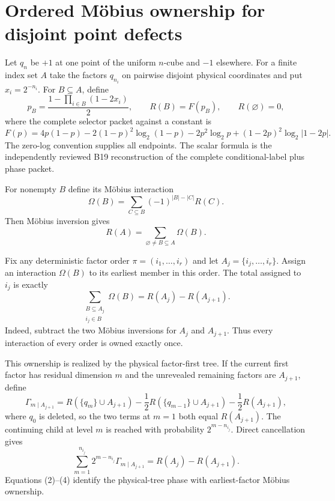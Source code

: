 \section*{Ordered Möbius ownership for disjoint point defects}

Let $q_n$ be $+1$ at one point of the uniform $n$-cube and $-1$
elsewhere.  For a finite index set $A$ take the factors $q_{n_i}$ on
pairwise disjoint physical coordinates and put $x_i=2^{-n_i}$.  For
$B\subseteq A$, define
\[
 p_B=\frac{1-\prod_{i\in B}(1-2x_i)}2,
 \qquad R(B)=F(p_B),\qquad R(\varnothing)=0,
\]
where the complete selector packet against a constant is
\[
 F(p)=4p(1-p)-2(1-p)^2\log_2(1-p)-2p^2\log_2p
 +(1-2p)^2\log_2|1-2p|.
\]
The zero-log convention supplies all endpoints.  The scalar formula is the
independently reviewed B19 reconstruction of the complete conditional-label
plus phase packet.

For nonempty $B$ define its Möbius interaction
\[
 \Omega(B)=\sum_{C\subseteq B}(-1)^{|B|-|C|}R(C).
\]
Then Möbius inversion gives
\begin{equation}
 R(A)=\sum_{\varnothing\ne B\subseteq A}\Omega(B).       \tag{1}
\end{equation}

Fix any deterministic factor order $\pi=(i_1,\ldots,i_r)$ and let
$A_j=\{i_j,\ldots,i_r\}$.  Assign an interaction $\Omega(B)$ to its earliest
member in this order.  The total assigned to $i_j$ is exactly
\begin{equation}
 \sum_{\substack{B\subseteq A_j\\ i_j\in B}}\Omega(B)
 =R(A_j)-R(A_{j+1}).                                    \tag{2}
\end{equation}
Indeed, subtract the two Möbius inversions for $A_j$ and $A_{j+1}$.
Thus every interaction of every order is owned exactly once.

This ownership is realized by the physical factor-first tree.  If the
current first factor has residual dimension $m$ and the unrevealed remaining
factors are $A_{j+1}$, define
\[
 \Gamma_{m\mid A_{j+1}}
 =R(\{q_m\}\cup A_{j+1})
 -\frac12R(\{q_{m-1}\}\cup A_{j+1})
 -\frac12R(A_{j+1}),                                    \tag{3}
\]
where $q_0$ is deleted, so the two terms at $m=1$ both equal
$R(A_{j+1})$.  The continuing child at level $m$ is reached with probability
$2^{m-n_{i_j}}$.  Direct cancellation gives
\begin{equation}
 \sum_{m=1}^{n_{i_j}}2^{m-n_{i_j}}\Gamma_{m\mid A_{j+1}}
 =R(A_j)-R(A_{j+1}).                                    \tag{4}
\end{equation}
Equations (2)--(4) identify the physical-tree phase with earliest-factor
Möbius ownership.

